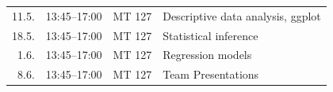 \documentclass[]{article}
\begin{document}
\begin{longtable}[c]{@{}rlll@{}}
\begin{minipage}[t]{0.09\columnwidth}
11.5.
\strut\end{minipage} &
\begin{minipage}[t]{0.15\columnwidth}\raggedright\strut
13:45--17:00
\strut\end{minipage} &
\begin{minipage}[t]{0.13\columnwidth}\raggedright\strut
MT 127
\strut\end{minipage} &
\begin{minipage}[t]{0.51\columnwidth}\raggedright\strut
Descriptive data analysis, ggplot
\strut\end{minipage}\tabularnewline
\begin{minipage}[t]{0.09\columnwidth}\raggedleft\strut
18.5.
\strut\end{minipage} &
\begin{minipage}[t]{0.15\columnwidth}\raggedright\strut
13:45--17:00
\strut\end{minipage} &
\begin{minipage}[t]{0.13\columnwidth}\raggedright\strut
MT 127
\strut\end{minipage} &
\begin{minipage}[t]{0.51\columnwidth}\raggedright\strut
Statistical inference
\strut\end{minipage}\tabularnewline
\begin{minipage}[t]{0.09\columnwidth}\raggedleft\strut
1.6.
\strut\end{minipage} &
\begin{minipage}[t]{0.15\columnwidth}\raggedright\strut
13:45--17:00
\strut\end{minipage} &
\begin{minipage}[t]{0.13\columnwidth}\raggedright\strut
MT 127
\strut\end{minipage} &
\begin{minipage}[t]{0.51\columnwidth}\raggedright\strut
Regression models
\strut\end{minipage}\tabularnewline
\begin{minipage}[t]{0.09\columnwidth}\raggedleft\strut
8.6.
\strut\end{minipage} &
\begin{minipage}[t]{0.15\columnwidth}\raggedright\strut
13:45--17:00
\strut\end{minipage} &
\begin{minipage}[t]{0.13\columnwidth}\raggedright\strut
MT 127
\strut\end{minipage} &
\begin{minipage}[t]{0.51\columnwidth}\raggedright\strut
Team Presentations
\strut\end{minipage}\tabularnewline
\bottomrule
\end{longtable}
\end{document}
